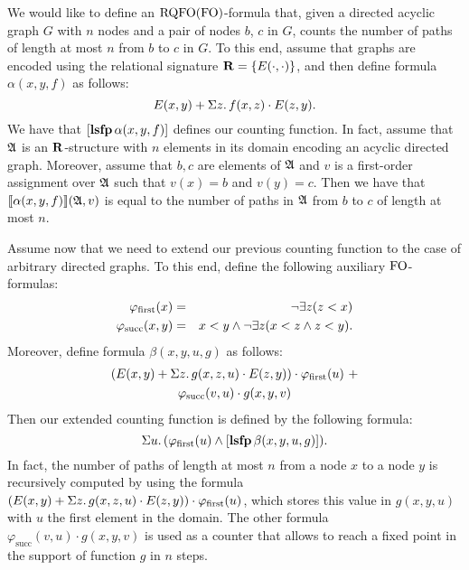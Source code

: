 \begin{example}
We would like to define an ${\rm RQFO}({\rm FO})$-formula that, given a directed acyclic graph $G$ with $n$ nodes and a pair of nodes $b$, $c$ in $G$, counts the number of paths of length at most $n$ from $b$ to $c$ in $G$. To this end, assume that graphs are encoded using the relational signature $\mathbf{R} = \{ E(\cdot,\cdot) \}$, and then define formula $\alpha(x, y, f)$ as follows:
$$
E(x,y) + \Sigma{z}.\, f(x,z)\cdot E(z,y).
$$
We have that $[{\bf lsfp} \, \alpha(x,y,f)]$ defines our counting function. In fact, assume that $\mathfrak{A}$ is an $\mathbf{R}$-structure with $n$ elements in its domain encoding an acyclic directed graph. Moreover, assume that $b,c$ are elements of $\mathfrak{A}$ and $v$ is a first-order assignment over $\mathfrak{A}$ such that $v(x) = b$ and $v(y) = c$. Then we have that ${\llbracket{}{\alpha(x,y,f)}\rrbracket}(\mathfrak{A},v)$ is equal to the  number of paths in $\mathfrak{A}$ from $b$ to $c$ of length at most $n$.

Assume now that we need to extend our previous counting function to the case of arbitrary directed graphs. To this end, define the following auxiliary ${\rm FO}$-formulas:
\begin{eqnarray*}
\varphi_{\text{\rm first}}(x) & = & \neg \exists z (z < x)\\
\varphi_{\text{succ}}(x,y) & = & x < y \wedge \neg \exists z ( x < z \wedge z < y).
\end{eqnarray*}
Moreover, define formula $\beta(x, y, u, g)$ as follows:
\begin{multline*}
(E(x,y) + \Sigma{z}.\, g(x,z,u)\cdot E(z,y)) \cdot \varphi_{\text{\rm first}}(u) \ +\\
\varphi_{\text{succ}}(v,u) \cdot g(x,y,v)
\end{multline*}
Then our extended counting function is defined by the following formula:
$$
\Sigma{u}.\, (\varphi_{\text{\rm first}}(u) \wedge [{\bf lsfp} \, \beta(x,y,u,g)]).
$$ 
In fact, the number of paths of length at most $n$ from a node $x$ to a node $y$ is recursively computed by using the formula $(E(x,y) + \Sigma{z}.\, g(x,z,u)\cdot E(z,y)) \cdot \varphi_{\text{\rm first}}(u)$, which stores this value in $g(x,y,u)$ with $u$ the first element in the domain.  The other formula $\varphi_{\text{succ}}(v,u) \cdot g(x,y,v)$ is used as a counter that allows to reach a fixed point in the support of function $g$ in $n$ steps.
\end{example}
%
%
